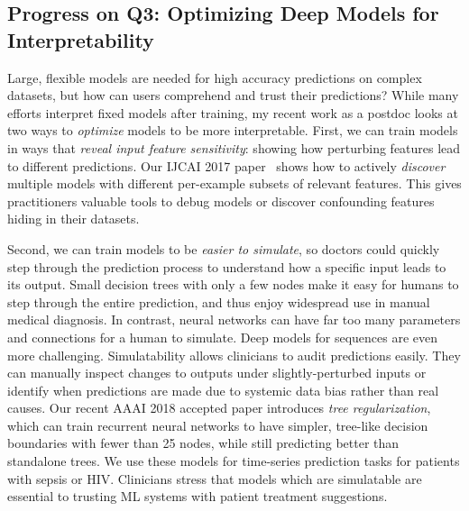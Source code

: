 \documentclass[11pt,letterpaper]{article}
\begin{document}

\subsection*{Progress on Q3: Optimizing Deep Models for Interpretability}

Large, flexible models are needed for high accuracy predictions on complex datasets, but how can users comprehend and trust their predictions? 
While many efforts interpret fixed models after training, my recent work as a postdoc looks at two ways to \emph{optimize} models to be more interpretable. First, we can train models in ways that \emph{reveal input feature sensitivity}: showing how perturbing features lead to different predictions. 
Our IJCAI 2017 paper~\citep{ross2017rrr} shows how to actively \emph{discover} multiple models with different per-example subsets of relevant features. This gives practitioners valuable tools to debug models or discover confounding features hiding in their datasets.

Second, we can train models to be \emph{easier to simulate}, so doctors could quickly step through the prediction process to understand how a specific input leads to its output.
Small
decision trees with only a few nodes make it easy for
humans to step through the entire prediction, and thus enjoy widespread use in manual medical diagnosis. In contrast,
neural networks can have far too many parameters and connections for a human to simulate. Deep models for sequences are even more
challenging.  
Simulatability allows clinicians to
audit predictions easily.  They can manually inspect changes to
outputs under slightly-perturbed inputs
or identify when predictions are made due to systemic data bias rather than real causes.
Our recent AAAI 2018 accepted paper introduces \emph{tree regularization},
which can train recurrent neural networks to have simpler, tree-like decision boundaries with fewer than 25 nodes, while still predicting better than standalone trees.
We use these models
for time-series prediction tasks for patients with sepsis or HIV.
Clinicians stress that models which are simulatable 
are essential to trusting ML systems with patient treatment suggestions.
\end{document}
